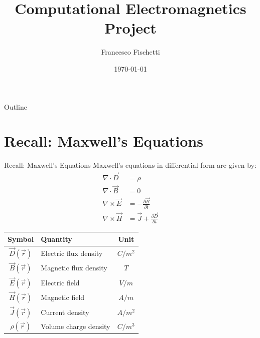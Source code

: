\documentclass[aspectratio=54,xcolor=dvipsnames]{beamer}
\title{Computational Electromagnetics Project}
\author{Francesco Fischetti}
\institute{Politecnico di Milano}
\date{\today}
\begin{document}
\begin{frame}
    \titlepage
\end{frame}

\begin{frame}{Outline}
    \tableofcontents
\end{frame}


\section{Recall: Maxwell's Equations}
\begin{frame}{Recall: Maxwell's Equations}
    Maxwell's equations in differential form are given by:
    \begin{align*}
        \nabla \cdot \vec{D} &= \rho \\
        \nabla \cdot \vec{B} &= 0 \\
        \nabla \times \vec{E} &= -\frac{\partial \vec{B}}{\partial t} \\
        \nabla \times \vec{H} &= \vec{J} + \frac{\partial \vec{D}}{\partial t}
    \end{align*}

    \begin{center}
    \begin{tabular}{|c|l|c|}
        \hline
        Symbol & Quantity & Unit \\
        \hline
        $\vec{D}(\vec{r})$ & Electric flux density & $C/m^2$ \\
        $\vec{B}(\vec{r})$ & Magnetic flux density & $T$ \\
        $\vec{E}(\vec{r})$ & Electric field & $V/m$ \\
        $\vec{H}(\vec{r})$ & Magnetic field & $A/m$ \\
        $\vec{J}(\vec{r})$ & Current density & $A/m^2$ \\
        $\rho(\vec{r})$ & Volume charge density & $C/m^3$ \\
        \hline
    \end{tabular}
    \end{center}
\end{frame}
\end{document}
